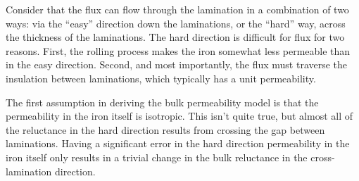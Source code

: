 \documentclass[12pt]{report}
\begin{document}
Consider that the flux can flow through the lamination in a
combination of two ways:  via the ``easy'' direction down the
laminations, or the ``hard'' way, across the thickness of the
laminations.  The hard direction is difficult for flux for two
reasons.  First, the rolling process makes the iron somewhat less
permeable than in the easy direction. Second, and most importantly,
the flux must traverse the insulation between laminations, which
typically has a unit permeability.

The first assumption in deriving the bulk permeability model is
that the permeability in the iron itself is isotropic.  This isn't
quite true, but almost all of the reluctance in the hard direction
results from crossing the gap between laminations.  Having a
significant error in the hard direction permeability in the iron
itself only results in a trivial change in the bulk reluctance in
the cross-lamination direction.
\end{document}
